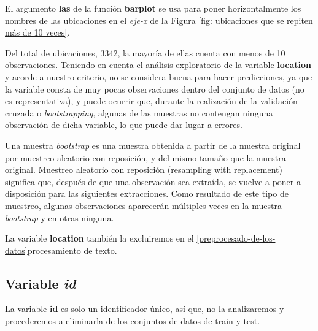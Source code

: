 \documentclass[]{article}
\newenvironment{Shaded}{\begin{snugshade}}{\end{snugshade}}
\newcommand{\NormalTok}[1]{#1}
\newcommand{\OperatorTok}[1]{\textcolor[rgb]{0.81,0.36,0.00}{\textbf{#1}}}
\newcommand{\OtherTok}[1]{\textcolor[rgb]{0.56,0.35,0.01}{#1}}
\newcommand{\StringTok}[1]{\textcolor[rgb]{0.31,0.60,0.02}{#1}}
\begin{document}
El argumento \textbf{las} de la función \textbf{barplot} se usa para poner horizontalmente los nombres de las ubicaciones en el \textit{eje-x} de la Figura \ref{fig: ubicaciones que se repiten más de 10 veces}.

Del total de ubicaciones, 3342, la mayoría de ellas cuenta con menos de 10 observaciones. Teniendo en cuenta el análisis exploratorio de la variable \textbf{location} y acorde a nuestro criterio, no se considera buena para hacer predicciones, ya que la variable consta de muy pocas observaciones dentro del conjunto de datos (no es representativa), y puede ocurrir que, durante la realización de la validación cruzada o \emph{bootstrapping}, algunas de las muestras no contengan ninguna observación de dicha variable, lo que puede dar lugar a errores.

\begin{tcolorbox}
	Una muestra \emph{bootstrap} es una muestra obtenida a partir de la
	muestra original por muestreo aleatorio con reposición, y del mismo
	tamaño que la muestra original. Muestreo aleatorio con reposición
	(resampling with replacement) significa que, después de que una
	observación sea extraída, se vuelve a poner a disposición para las
	siguientes extracciones. Como resultado de este tipo de muestreo,
	algunas observaciones aparecerán múltiples veces en la muestra \emph{bootstrap} 
	y en otras ninguna.
\end{tcolorbox}

La variable \textbf{location} también la excluiremos en el \ref{preprocesado-de-los-datos}{procesamiento de texto}.

\hypertarget{variable-id}{%
\subsection{\texorpdfstring{Variable
\emph{id}}{Variable id}}\label{variable-id}}

La variable \textbf{id} es solo un identificador único, así que, no la
analizaremos y procederemos a eliminarla de los conjuntos de datos de
train y test.

\vspace{3mm}

\begin{Shaded}
\end{Shaded}
\end{document}
